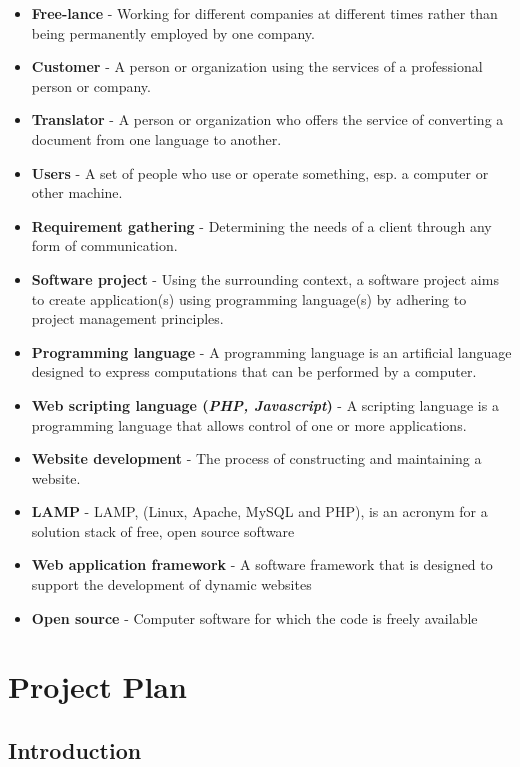 \documentclass{l3proj}
\begin{document}
\begin{itemize}
\item{\textbf{Free-lance} - Working for different companies at different times rather than being permanently employed by one company.} 
\item{\textbf{Customer} - A person or organization using the services of a professional person or company.}
\item{\textbf{Translator} - A person or organization who offers the service of converting a document from one language to another.}
\item{\textbf{Users} - A set of people who use or operate something, esp. a computer or other machine.}
\item{\textbf{Requirement gathering} - Determining the needs of a client through any form of communication.}
\item{\textbf{Software project} - Using the surrounding context, a software project aims to create application(s) using programming language(s) by adhering to project management principles.}
\item{\textbf{Programming language} - A programming language is an artificial language designed to express computations that can be performed by a computer.}
\item{\textbf{Web scripting language (\textit{PHP, Javascript})} - A scripting language is a programming language that allows control of one or more applications.}
\item{\textbf{Website development} - The process of constructing and maintaining a website.}
\item{\textbf{LAMP} - LAMP, (Linux, Apache, MySQL and PHP), is an acronym for a solution stack of free, open source software}
\item{\textbf{Web application framework} - A software framework that is designed to support the development of dynamic websites }
\item{\textbf{Open source} - Computer software for which the code is freely available }
\end{itemize}
\chapter{Project Plan}

\section{Introduction}
\end{document}
